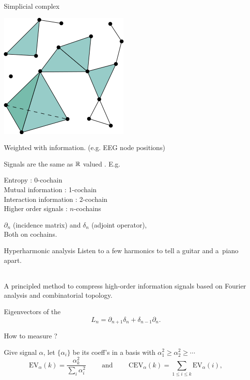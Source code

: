\begin{frame}{Simplicial complex}

	\begin{center}
		\includegraphics[scale=.35]{aux/simplicial_complex}
	\end{center}

	\pause
	Weighted with  information. (e.g. EEG node positions)

	\pause\medskip
	Signals are the same as $\mathbb{R}$ valued . E.g.

	\qquad Entropy : 0-cochain \\
	\qquad Mutual information : 1-cochain \\
	\qquad Interaction information : 2-cochain \\
	\qquad Higher order signals : $n$-cochains

	\pause\medskip
	 $\partial_n$ (incidence matrix) and  $\delta_n$ (adjoint operator),\\
	\smallskip
	Both  on cochains.
\end{frame}

\begin{frame}{Hyperharmonic analysis}
	\pause
	 Listen to a few harmonics to tell a guitar and a~piano apart.

	\pause\bigskip
	\\
	A principled method to compress high-order information signals based on Fourier analysis and combinatorial topology.

	\pause\bigskip
	 Eigenvectors of the 
	\[
	\displaystyle{L_n = \partial_{n+1} \delta_n + \delta_{n-1} \partial_{n}}.
	\]

	\pause\medskip
	How to measure ?

	\pause\medskip
	Give signal $\alpha$, let $\{\alpha_i\}$ be its coeff's in a basis with $\alpha_1^2 \geq \alpha_2^2 \geq \cdots$
	\begin{equation*}
		\text{EV}_{\alpha}(k) = \frac{ \alpha_k^2}{{\displaystyle \sum_{i} \alpha_i^2}}
		\qquad \text{ and } \qquad
		\text{CEV}_{\alpha}(k) = \sum_{1\leq i \leq k} \text{EV}_{\alpha}(i),
	\end{equation*}
\end{frame}

